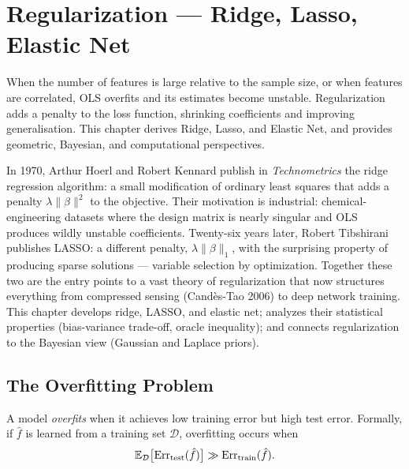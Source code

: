 \chapter{Regularization --- Ridge, Lasso, Elastic Net}\label{ch:regularization}

\begin{intuition}[title=\textbf{Chapter Overview}]
When the number of features is large relative to the sample size, or when features are correlated, OLS overfits and its estimates become unstable. Regularization adds a penalty to the loss function, shrinking coefficients and improving generalisation. This chapter derives Ridge, Lasso, and Elastic Net, and provides geometric, Bayesian, and computational perspectives.
\end{intuition}

In 1970, Arthur Hoerl and Robert Kennard publish in \emph{Technometrics} the ridge regression algorithm: a small modification of ordinary least squares that adds a penalty $\lambda \|\beta\|^2$ to the objective. Their motivation is industrial: chemical-engineering datasets where the design matrix is nearly singular and OLS produces wildly unstable coefficients. Twenty-six years later, Robert Tibshirani publishes LASSO: a different penalty, $\lambda \|\beta\|_1$, with the surprising property of producing sparse solutions --- variable selection by optimization. Together these two are the entry points to a vast theory of regularization that now structures everything from compressed sensing (Candès-Tao 2006) to deep network training. This chapter develops ridge, LASSO, and elastic net; analyzes their statistical properties (bias-variance trade-off, oracle inequality); and connects regularization to the Bayesian view (Gaussian and Laplace priors).

\section{The Overfitting Problem}

\begin{definition}[Overfitting]
A model \emph{overfits} when it achieves low training error but high test error. Formally, if $\hat{f}$ is learned from a training set $\mathcal{D}$, overfitting occurs when
\[
    \mathbb{E}_{\mathcal{D}}\bigl[\text{Err}_{\text{test}}(\hat{f})\bigr] \gg \text{Err}_{\text{train}}(\hat{f}).
\]
\end{definition}


